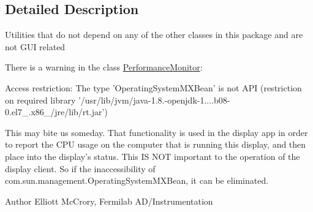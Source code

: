 \subsection{Detailed Description}
Utilities that do not depend on any of the other classes in this package and are not G\-U\-I related

There is a warning in the class \hyperlink{classgov_1_1fnal_1_1ppd_1_1dd_1_1util_1_1nonguiUtils_1_1PerformanceMonitor}{Performance\-Monitor}\-:

Access restriction\-: The type 'Operating\-System\-M\-X\-Bean' is not A\-P\-I (restriction on required library '/usr/lib/jvm/java-\/1.8.-\/openjdk-\/1....\-b08-\/0.\-el7\-\_.\-x86\-\_/jre/lib/rt.jar')

This may bite us someday. That functionality is used in the display app in order to report the C\-P\-U usage on the computer that is running this display, and then place into the display's status. This I\-S N\-O\-T important to the operation of the display client. So if the inaccessibility of com.\-sun.\-management.\-Operating\-System\-M\-X\-Bean, it can be eliminated.

\begin{DoxyAuthor}{Author}
Elliott Mc\-Crory, Fermilab A\-D/\-Instrumentation 
\end{DoxyAuthor}
